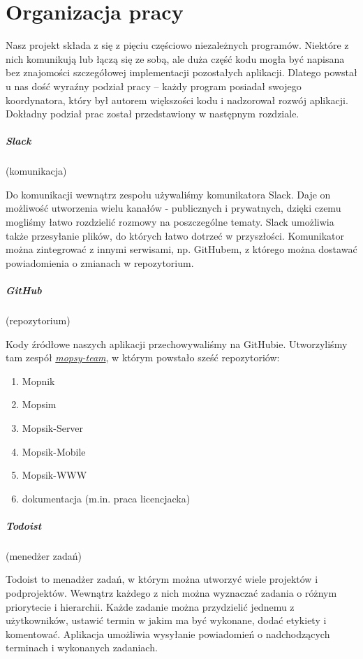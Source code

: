 \chapter{Organizacja pracy}
Nasz projekt składa z się z pięciu częściowo niezależnych programów. Niektóre z nich komunikują lub łączą się ze sobą, ale duża część kodu mogła być napisana bez znajomości szczegółowej implementacji pozostałych aplikacji. Dlatego powstał u nas dość wyraźny podział pracy -- każdy program posiadał swojego koordynatora, który był autorem większości kodu i nadzorował rozwój aplikacji. Dokładny podział prac został przedstawiony w następnym rozdziale. 

\paragraph{Slack}(komunikacja)

Do komunikacji wewnątrz zespołu używaliśmy komunikatora Slack. Daje on możliwość utworzenia wielu kanałów - publicznych i prywatnych, dzięki czemu mogliśmy łatwo rozdzielić rozmowy na poszczególne tematy. Slack umożliwia także przesyłanie plików, do których łatwo dotrzeć w przyszłości. Komunikator można zintegrować z innymi serwisami, np. GitHubem, z którego można dostawać powiadomienia o zmianach w repozytorium.

\paragraph{GitHub}(repozytorium)

Kody źródłowe naszych aplikacji przechowywaliśmy na GitHubie. Utworzyliśmy tam zespół \href{https://github.com/mopsy-team}{\textit{mopsy-team}}, w którym powstało sześć repozytoriów:
\begin{enumerate}
\item Mopnik
\item Mopsim
\item Mopsik-Server
\item Mopsik-Mobile
\item Mopsik-WWW
\item dokumentacja (m.in. praca licencjacka)
\end{enumerate}

\paragraph{Todoist}(menedżer zadań)

Todoist to menadżer zadań, w którym można utworzyć wiele projektów i podprojektów. Wewnątrz każdego z nich można wyznaczać zadania o różnym priorytecie i hierarchii. Każde zadanie można przydzielić jednemu z użytkowników, ustawić termin w jakim ma być wykonane, dodać etykiety i komentować. Aplikacja umożliwia wysyłanie powiadomień o nadchodzących terminach i wykonanych zadaniach.


